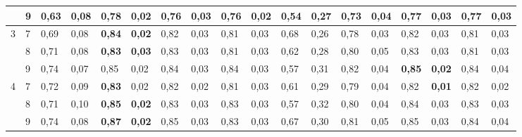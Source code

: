 \documentclass[conference]{IEEEtran}
\begin{document}
\begin{table}[]
\begin{tabular}{|cl|ll|ll|ll|ll|ll|ll|ll|ll|}
		\multicolumn{1}{|c|}{} & 9 & \multicolumn{1}{l|}{0,63} & 0,08 & \multicolumn{1}{l|}{\textbf{0,78}} & \textbf{0,02} & \multicolumn{1}{l|}{0,76} & 0,03 & \multicolumn{1}{l|}{0,76} & 0,02 & \multicolumn{1}{l|}{0,54} & 0,27 & \multicolumn{1}{l|}{0,73} & 0,04 & \multicolumn{1}{l|}{0,77} & 0,03 & \multicolumn{1}{l|}{0,77} & 0,03 \\ \hline
		\multicolumn{1}{|c|}{\multirow{3}{*}{3}} & 7 & \multicolumn{1}{l|}{0,69} & 0,08 & \multicolumn{1}{l|}{\textbf{0,84}} & \textbf{0,02} & \multicolumn{1}{l|}{0,82} & 0,03 & \multicolumn{1}{l|}{0,81} & 0,03 & \multicolumn{1}{l|}{0,68} & 0,26 & \multicolumn{1}{l|}{0,78} & 0,03 & \multicolumn{1}{l|}{0,82} & 0,03 & \multicolumn{1}{l|}{0,81} & 0,03 \\ \cline{2-18} 
		\multicolumn{1}{|c|}{} & 8 & \multicolumn{1}{l|}{0,71} & 0,08 & \multicolumn{1}{l|}{\textbf{0,83}} & \textbf{0,03} & \multicolumn{1}{l|}{0,83} & 0,03 & \multicolumn{1}{l|}{0,81} & 0,03 & \multicolumn{1}{l|}{0,62} & 0,28 & \multicolumn{1}{l|}{0,80} & 0,05 & \multicolumn{1}{l|}{0,83} & 0,03 & \multicolumn{1}{l|}{0,81} & 0,03 \\ \cline{2-18} 
		\multicolumn{1}{|c|}{} & 9 & \multicolumn{1}{l|}{0,74} & 0,07 & \multicolumn{1}{l|}{0,85} & 0,02 & \multicolumn{1}{l|}{0,84} & 0,03 & \multicolumn{1}{l|}{0,84} & 0,03 & \multicolumn{1}{l|}{0,57} & 0,31 & \multicolumn{1}{l|}{0,82} & 0,04 & \multicolumn{1}{l|}{\textbf{0,85}} & \textbf{0,02} & \multicolumn{1}{l|}{0,84} & 0,04 \\ \hline
		\multicolumn{1}{|c|}{\multirow{3}{*}{4}} & 7 & \multicolumn{1}{l|}{0,72} & 0,09 & \multicolumn{1}{l|}{\textbf{0,83}} & 0,02 & \multicolumn{1}{l|}{0,82} & 0,02 & \multicolumn{1}{l|}{0,81} & 0,03 & \multicolumn{1}{l|}{0,61} & 0,29 & \multicolumn{1}{l|}{0,79} & 0,04 & \multicolumn{1}{l|}{0,82} & \textbf{0,01} & \multicolumn{1}{l|}{0,82} & 0,02 \\ \cline{2-18} 
		\multicolumn{1}{|c|}{} & 8 & \multicolumn{1}{l|}{0,71} & 0,10 & \multicolumn{1}{l|}{\textbf{0,85}} & \textbf{0,02} & \multicolumn{1}{l|}{0,83} & 0,03 & \multicolumn{1}{l|}{0,83} & 0,03 & \multicolumn{1}{l|}{0,57} & 0,32 & \multicolumn{1}{l|}{0,80} & 0,04 & \multicolumn{1}{l|}{0,84} & 0,03 & \multicolumn{1}{l|}{0,83} & 0,03 \\ \cline{2-18} 
		\multicolumn{1}{|c|}{} & 9 & \multicolumn{1}{l|}{0,74} & 0,08 & \multicolumn{1}{l|}{\textbf{0,87}} & \textbf{0,02} & \multicolumn{1}{l|}{0,85} & 0,03 & \multicolumn{1}{l|}{0,83} & 0,03 & \multicolumn{1}{l|}{0,67} & 0,30 & \multicolumn{1}{l|}{0,81} & 0,05 & \multicolumn{1}{l|}{0,85} & 0,03 & \multicolumn{1}{l|}{0,84} & 0,04 \\ \hline

\end{tabular}
\end{table}
\end{document}

